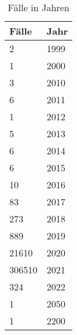 
\begin{center}
 \begin{longtable}{|p{2.3cm}|p{2.5cm}|}
  \caption{Fälle in Jahren} \\
  \hline
\rowcolor{lightgray} Fälle & Jahr \\ \hline
\endhead
2 & 1999 \\ \hline
1 & 2000 \\ \hline
3 & 2010 \\ \hline
6 & 2011 \\ \hline
1 & 2012 \\ \hline
5 & 2013 \\ \hline
6 & 2014 \\ \hline
6 & 2015 \\ \hline
10 & 2016 \\ \hline
83 & 2017 \\ \hline
273 & 2018 \\ \hline
889 & 2019 \\ \hline
21610 & 2020 \\ \hline
306510 & 2021 \\ \hline
324 & 2022 \\ \hline
1 & 2050 \\ \hline
1 & 2200 \\ \hline
\end{longtable}
\end{center}
